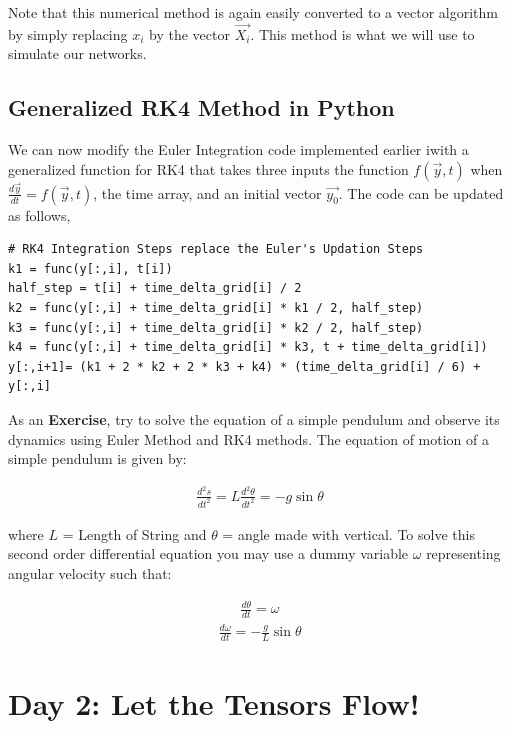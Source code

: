 \documentclass[10pt,letterpaper]{article}
\begin{document}
Note that this numerical method is again easily converted to a vector algorithm by simply replacing $x_i$ by the vector $\vec{X_i}$. This method is what we will use to simulate our networks.


\subsection*{Generalized RK4 Method in Python}

We can now modify the Euler Integration code implemented earlier iwith a generalized function for RK4 that takes three inputs \textemdash the function $f(\vec{y},t)$ when $\frac{d\vec{y}}{dt}=f(\vec{y},t)$, the time array, and an initial vector $\vec{y_0}$. The code can be updated as follows,

\begin{verbatim}
# RK4 Integration Steps replace the Euler's Updation Steps
k1 = func(y[:,i], t[i])                               
half_step = t[i] + time_delta_grid[i] / 2
k2 = func(y[:,i] + time_delta_grid[i] * k1 / 2, half_step)
k3 = func(y[:,i] + time_delta_grid[i] * k2 / 2, half_step)
k4 = func(y[:,i] + time_delta_grid[i] * k3, t + time_delta_grid[i])
y[:,i+1]= (k1 + 2 * k2 + 2 * k3 + k4) * (time_delta_grid[i] / 6) + y[:,i]
\end{verbatim}

As an \textbf{Exercise}, try to solve the equation of a simple pendulum and observe its dynamics using Euler Method and RK4 methods. The equation of motion of a simple pendulum is given by: 

\begin{eqnarray}\frac{d^2s}{dt^2}=L\frac{d^2\theta}{dt^2}=-g\sin{\theta}\end{eqnarray}

where $L$ = Length of String and $\theta$ = angle made with vertical. To solve this second order differential equation you may use a dummy variable $\omega$ representing angular velocity such that:

\begin{eqnarray}\frac{d\theta}{dt}=\omega \end{eqnarray}
\begin{eqnarray}\frac{d\omega}{dt}=-\frac{g}{L}\sin{\theta} \end{eqnarray}

\section*{Day 2: Let the Tensors Flow!}
\end{document}
